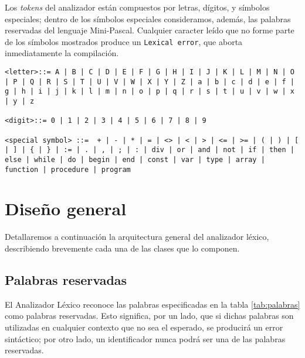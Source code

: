 \documentclass[a4paper,oneside]{report}
\begin{document}
Los \textit{tokens} del analizador están compuestos por letras, dígitos, y símbolos especiales; dentro de los símbolos especiales consideramos, además, las palabras reservadas del lenguaje Mini-Pascal. Cualquier caracter leído que no forme parte de los símbolos mostrados produce un \texttt{Lexical error}, que aborta inmediatamente la compilación.

\begin{verbatim}
<letter>::= A | B | C | D | E | F | G | H | I | J | K | L | M | N | O | P | Q | R | S | T | U | V | W | X | Y | Z | a | b | c | d | e | f | g | h | i | j | k | l | m | n | o | p | q | r | s | t | u | v | w | x | y | z

<digit>::= 0 | 1 | 2 | 3 | 4 | 5 | 6 | 7 | 8 | 9

<special symbol> ::=  + | - | * | = | <> | < | > | <= | >= | ( | ) | [ | ] | { | } | := | . | , | ; | : | div | or | and | not | if | then | else | while | do | begin | end | const | var | type | array | function | procedure | program
\end{verbatim}

\section{Diseño general}

Detallaremos a continuación la arquitectura general del analizador léxico, describiendo brevemente cada una de las clases que lo componen. 

\subsection{Palabras reservadas}
El Analizador Léxico reconoce las palabras especificadas en la tabla \ref{tab:palabras} como palabras reservadas. Esto significa, por un lado, que si dichas palabras son utilizadas en cualquier contexto que no sea el esperado, se producirá un error sintáctico; por otro lado, un identificador nunca podrá ser una de las palabras reservadas.
\end{document}
